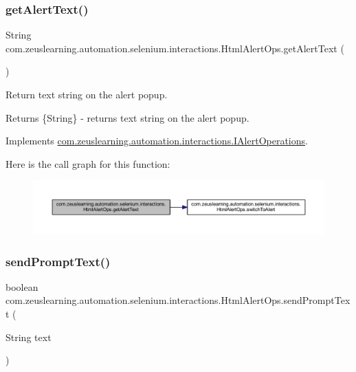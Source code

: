 \subsubsection{\texorpdfstring{get\+Alert\+Text()}{getAlertText()}}
{\footnotesize\ttfamily String com.\+zeuslearning.\+automation.\+selenium.\+interactions.\+Html\+Alert\+Ops.\+get\+Alert\+Text (\begin{DoxyParamCaption}{ }\end{DoxyParamCaption})\hspace{0.3cm}{\ttfamily [inline]}}

Return text string on the alert popup.

\begin{DoxyReturn}{Returns}
\{String\} -\/ returns text string on the alert popup. 
\end{DoxyReturn}


Implements \hyperlink{interfacecom_1_1zeuslearning_1_1automation_1_1interactions_1_1IAlertOperations_a25201bfa012a2411b487821f1837476a}{com.\+zeuslearning.\+automation.\+interactions.\+I\+Alert\+Operations}.

Here is the call graph for this function\+:\nopagebreak
\begin{figure}[H]
\begin{center}
\leavevmode
\includegraphics[width=350pt]{d9/d71/classcom_1_1zeuslearning_1_1automation_1_1selenium_1_1interactions_1_1HtmlAlertOps_a7d65f164e9145ca8035e196c7dd7da87_cgraph}
\end{center}
\end{figure}
\hypertarget{classcom_1_1zeuslearning_1_1automation_1_1selenium_1_1interactions_1_1HtmlAlertOps_a22d69cc0ac8d155f99a5dc1e48db142d}{}\label{classcom_1_1zeuslearning_1_1automation_1_1selenium_1_1interactions_1_1HtmlAlertOps_a22d69cc0ac8d155f99a5dc1e48db142d} 
\subsubsection{\texorpdfstring{send\+Prompt\+Text()}{sendPromptText()}}
{\footnotesize\ttfamily boolean com.\+zeuslearning.\+automation.\+selenium.\+interactions.\+Html\+Alert\+Ops.\+send\+Prompt\+Text (\begin{DoxyParamCaption}\item[{String}]{text }\end{DoxyParamCaption})\hspace{0.3cm}{\ttfamily [inline]}}

